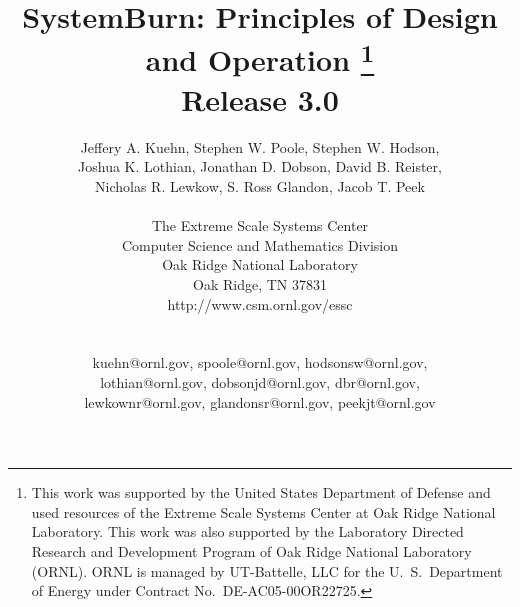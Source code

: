 \title{
	SystemBurn: Principles of Design and Operation
	\footnote{
		This work was supported by the United States Department of Defense and used resources of the
		Extreme Scale Systems Center at Oak Ridge National Laboratory.
		This work was also supported by the Laboratory Directed Research and
		Development Program of Oak Ridge National Laboratory (ORNL). ORNL is managed by UT-Battelle,
		LLC for the U.~S.~Department of Energy under Contract No.~DE-AC05-00OR22725.
	} \\
	Release 3.0\\
}

\author{
Jeffery A. Kuehn, Stephen W. Poole, Stephen W. Hodson,\\
Joshua K. Lothian, Jonathan D. Dobson, David B. Reister, \\
Nicholas R. Lewkow, S. Ross Glandon, Jacob T. Peek \\
\\
The Extreme Scale Systems Center \\
Computer Science and Mathematics Division \\
Oak Ridge National Laboratory \\
Oak Ridge, TN 37831 \\
http://www.csm.ornl.gov/essc\\
\\
\\
kuehn@ornl.gov, spoole@ornl.gov, hodsonsw@ornl.gov,\\
lothian@ornl.gov, dobsonjd@ornl.gov, dbr@ornl.gov, \\
lewkownr@ornl.gov, glandonsr@ornl.gov, peekjt@ornl.gov\\
}
\maketitle

